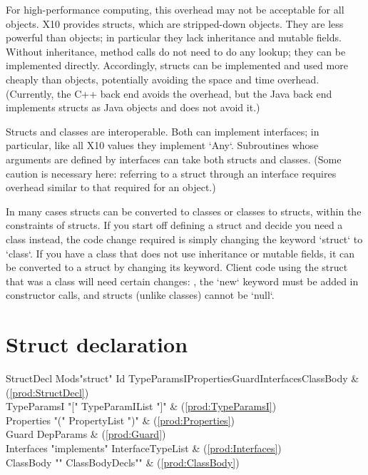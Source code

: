 For high-performance computing, this overhead may not be acceptable for all
objects. X10 provides structs, which are stripped-down objects. They are less
powerful than objects; in particular they lack inheritance and mutable fields.
Without inheritance, method calls do not need to do any lookup; they can be
implemented directly. Accordingly, structs can be implemented and used more
cheaply than objects, potentially avoiding the space and time overhead.
(Currently, the C++ back end avoids the overhead, but the Java back end
implements structs as Java objects and does not avoid it.)

Structs and classes are interoperable. Both can implement interfaces; in
particular, like all X10 values they implement \xcd`Any`.  Subroutines 
whose arguments are defined by interfaces can take both structs and classes.
(Some caution is necessary here: referring to a struct through an interface
requires overhead similar to that required for an object.)

In many cases structs can be converted to classes or classes to structs,
within the constraints of structs. If you start off defining a struct and
decide you need a class instead, the code change required is simply changing
the keyword \xcd`struct` to \xcd`class`. If you have a class that does not use
inheritance or mutable fields, it can be converted to a struct by changing its
keyword. Client code using the struct that was a class will need certain
changes: \eg, the \xcd`new` keyword must be added in constructor calls, and
structs (unlike classes) cannot be \xcd`null`.  



\section{Struct declaration}

\begin{bbgrammar}
          StructDecl \: Mods\opt \xcd"struct" Id TypeParamsI\opt Properties\opt Guard\opt Interfaces\opt ClassBody & (\ref{prod:StructDecl}) \\
         TypeParamsI \: \xcd"[" TypeParamIList \xcd"]" & (\ref{prod:TypeParamsI}) \\
          Properties \: \xcd"(" PropertyList \xcd")" & (\ref{prod:Properties}) \\
               Guard \: DepParams & (\ref{prod:Guard}) \\
          Interfaces \: \xcd"implements" InterfaceTypeList & (\ref{prod:Interfaces}) \\
           ClassBody \: \xcd"{" ClassBodyDecls\opt \xcd"}" & (\ref{prod:ClassBody}) \\
\end{bbgrammar}



